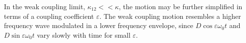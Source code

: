 In the weak coupling limit, $\kappa_{12} << \kappa$, the motion may be further simplified in terms of a coupling coefficient $\varepsilon$. The weak coupling motion resembles a higher frequency wave modulated in a lower frequency envelope, since $D\cos\varepsilon\omega_0 t$ and $D\sin\varepsilon\omega_0 t$ vary slowly with time for small $\varepsilon$.

